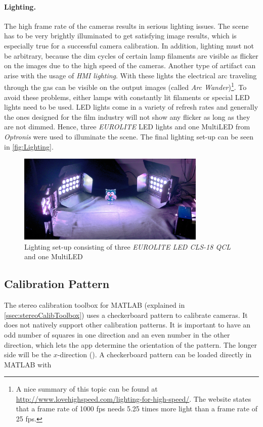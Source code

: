 \paragraph{Lighting.}\label{par:Lighting}
The high frame rate of the cameras results in serious lighting issues. The scene has to be very brightly illuminated to get satisfying image results, which is especially true for a successful camera calibration. In addition, lighting must not be arbitrary, because the dim cycles of certain lamp filaments are visible as flicker on the images due to the high speed of the cameras. Another type of artifact can arise with the usage of \textit{HMI lighting}. With these lights the electrical arc traveling through the gas can be visible on the output images (called \textit{Arc Wander})\footnote{A nice summary of this topic can be found at \url{http://www.lovehighspeed.com/lighting-for-high-speed/}. The website states that a frame rate of 1000 fps needs 5.25 times more light than a frame rate of 25 fps.}. To avoid these problems, either lamps with constantly lit filaments or special LED lights need to be used. LED lights come in a variety of refresh rates and generally the ones designed for the film industry will not show any flicker as long as they are not dimmed. Hence, three \textit{EUROLITE} LED lights and one MultiLED from \textit{Optronis} were used to illuminate the scene. The final lighting set-up can be seen in \autoref{fig:Lighting}.

\begin{figure}[htbp]
		\centering
		\includegraphics[width=0.8\textwidth]{figures/lighting}
		\caption[Lighting set-up]{Lighting set-up consisting of three \textit{EUROLITE LED CLS-18 QCL} and one MultiLED }
		\label{fig:Lighting}
\end{figure}

\subsection{Calibration Pattern}\label{ssec:calibPattern}
The stereo calibration toolbox for MATLAB (explained in \autoref{ssec:stereoCalibToolbox}) uses a checkerboard pattern to calibrate cameras. It does not natively support other calibration patterns. It is important to have an odd number of squares in one direction and an even number in the other direction, which lets the app determine the orientation of the pattern. The longer side will be the $x$-direction (\cite{StereoCalib.2016}).
A checkerboard pattern can be loaded directly in MATLAB with 

